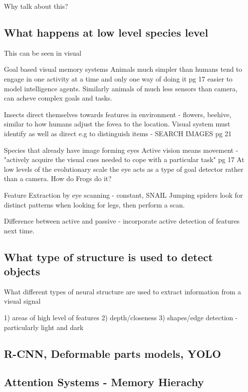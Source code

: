 \documentclass{mproj}
\begin{document}
Why talk about this?

\subsection{What happens at low level species level}
This can be seen in visual 


Goal based visual memory systems
  Animals much simpler than humans tend to engage in one activity at a time and only one way of doing it pg 17 easier to model intelligence agents. Similarly animals of much less sensors than camera, can acheve complex goals and tasks.
  
  Insects direct themselves towards features in environment - flowers, beehive, similar to how humans adjust the fovea to the location. 
  Visual system must identify as well as direct e.g to distinguish items - SEARCH IMAGES pg 21
  
  
  Species that already have image forming eyes
  Active vision means movement - "actively acquire the visual cues needed to cope with a particular task" pg 17
  At low levels of the evolutionary scale the eye acts as a type of goal detector rather than a camera. 
  How do Frogs do it?
  
  Feature Extraction by eye scanning - constant, SNAIL
  Jumping spiders look for distinct patterns when looking for legs, then perform a scan.
  
  Difference between active and passive - incorporate active detection of features next time.


\subsection{What type of structure is used to detect objects}

What different types of neural structure are used to extract information from a visual signal

1) areas of high level of features
2) depth/closeness
3) shapes/edge detection - particularly light and dark

\subsection{R-CNN, Deformable parts models, YOLO}

\subsection{Attention Systems - Memory Hierachy}
\end{document}
